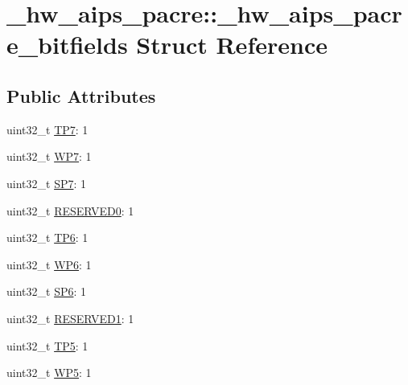 \hypertarget{struct__hw__aips__pacre_1_1__hw__aips__pacre__bitfields}{}\section{\+\_\+hw\+\_\+aips\+\_\+pacre\+:\+:\+\_\+hw\+\_\+aips\+\_\+pacre\+\_\+bitfields Struct Reference}
\label{struct__hw__aips__pacre_1_1__hw__aips__pacre__bitfields}
\subsection*{Public Attributes}
\begin{DoxyCompactItemize}
\item 
uint32\+\_\+t \hyperlink{struct__hw__aips__pacre_1_1__hw__aips__pacre__bitfields_ab2b5161982619b3ea9bb691223d0d851}{T\+P7}\+: 1
\item 
uint32\+\_\+t \hyperlink{struct__hw__aips__pacre_1_1__hw__aips__pacre__bitfields_aea62bfbf628ba28d86dc538a625fd5c9}{W\+P7}\+: 1
\item 
uint32\+\_\+t \hyperlink{struct__hw__aips__pacre_1_1__hw__aips__pacre__bitfields_aa2783654d080ee06bf51ba24a8b8d7e0}{S\+P7}\+: 1
\item 
uint32\+\_\+t \hyperlink{struct__hw__aips__pacre_1_1__hw__aips__pacre__bitfields_a55627b03a5149af75072b058673a6cf6}{R\+E\+S\+E\+R\+V\+E\+D0}\+: 1
\item 
uint32\+\_\+t \hyperlink{struct__hw__aips__pacre_1_1__hw__aips__pacre__bitfields_ada34a5606ebfb087716454a140296bb3}{T\+P6}\+: 1
\item 
uint32\+\_\+t \hyperlink{struct__hw__aips__pacre_1_1__hw__aips__pacre__bitfields_ac2ba9fbf7f2f93d1990af729df8fa366}{W\+P6}\+: 1
\item 
uint32\+\_\+t \hyperlink{struct__hw__aips__pacre_1_1__hw__aips__pacre__bitfields_ab98fd928138c241d20846bd9ddf628e2}{S\+P6}\+: 1
\item 
uint32\+\_\+t \hyperlink{struct__hw__aips__pacre_1_1__hw__aips__pacre__bitfields_afcdbf9366961cf62617ba1f564aa1eb0}{R\+E\+S\+E\+R\+V\+E\+D1}\+: 1
\item 
uint32\+\_\+t \hyperlink{struct__hw__aips__pacre_1_1__hw__aips__pacre__bitfields_a8447368822e5f4ac02166131dad35052}{T\+P5}\+: 1
\item 
uint32\+\_\+t \hyperlink{struct__hw__aips__pacre_1_1__hw__aips__pacre__bitfields_a376989a85326626aff2d483895ea8294}{W\+P5}\+: 1

\end{DoxyCompactItemize}
